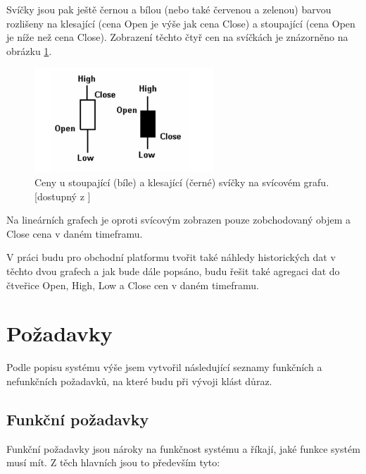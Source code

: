 \documentclass[thesis=M,czech]{FITthesis}[2012/06/26]
\begin{document}
	Svíčky jsou pak ještě černou a bílou (nebo také červenou a zelenou) barvou rozlišeny na klesající (cena Open je výše jak cena Close) a stoupající (cena Open je níže než cena Close). Zobrazení těchto čtyř cen na svíčkách je znázorněno na obrázku \ref{fig:chart_candle}.
	
\begin{figure}[h]
	\centering
	\includegraphics[width=0.6\textwidth]{images/candlestick}
 	\caption[Význam jednotlivých částí svíček ve svícovém grafu.]{Ceny u stoupající (bíle) a klesající (černé) svíčky na svícovém grafu. [dostupný z \cite{CandleStickChart}]}
 	\label{fig:chart_candle}
\end{figure}

	Na lineárních grafech je oproti svícovým zobrazen pouze zobchodovaný objem a Close cena v daném timeframu.
	
	V práci budu pro obchodní platformu tvořit také náhledy historických dat v těchto dvou grafech a jak bude dále popsáno, budu řešit také agregaci dat do  čtveřice Open, High, Low a Close cen v daném timeframu.
	
\section{Požadavky}
	
	Podle popisu systému výše jsem vytvořil následující seznamy funkčních a nefunkčních požadavků, na které budu při vývoji klást důraz.

\subsection{Funkční požadavky}
	
	Funkční požadavky jsou nároky na funkčnost systému a říkají, jaké funkce systém musí mít. Z těch hlavních jsou to především tyto:
\end{document}
